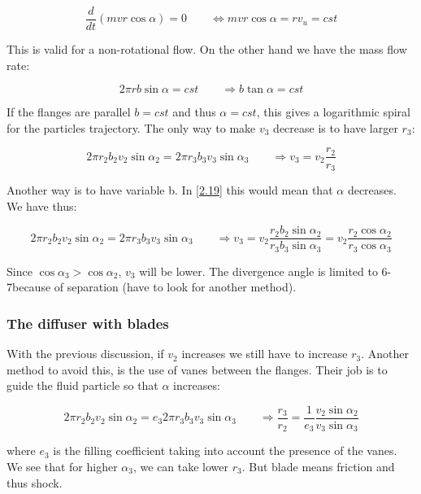 \begin{equation}
\frac{d}{dt} (mvr\cos \alpha) = 0 \qquad \Leftrightarrow mvr\cos \alpha = rv_u = cst
\end{equation}

This is valid for a non-rotational flow. On the other hand we have the mass flow rate: 

\begin{equation}
2 \pi r b \sin \alpha = cst \qquad \Rightarrow b \tan \alpha = cst
\label{2.19}
\end{equation}

If the flanges are parallel $b = cst$ and thus $\alpha = cst$, this gives a logarithmic spiral for the particles trajectory. The only way to make $v_3$ decrease is to have larger $r_3$: 

\begin{equation}
2\pi r_2 b_2 v_2 \sin \alpha _2 = 2\pi r_3 b_3 v_3 \sin \alpha _3 \qquad \Rightarrow v_3 = v_2 \frac{r_2}{r_3}
\end{equation}

Another way is to have variable b. In \eqref{2.19} this would mean that $\alpha$ decreases. We have thus: 

\begin{equation}
2\pi r_2 b_2v_2 \sin \alpha _2 = 2\pi r_3 b_3 v_3\sin \alpha _3 \qquad \Rightarrow v_3 = v_2\frac{r_2 b_2 \sin \alpha _2}{r_3 b_3 \sin \alpha _3} = v_2\frac{r_2 \cos \alpha _2}{r_3 \cos \alpha _3}
\end{equation}

Since $\cos \alpha _3> \cos \alpha _2$, $v_3$ will be lower. The divergence angle is limited to 6-7\degres because of separation (have to look for another method). 

\subsubsection{The diffuser with blades}
With the previous discussion, if $v_2$ increases we still have to increase $r_3$. Another method to avoid this, is the use of vanes between the flanges. Their job is to guide the fluid particle so that $\alpha$ increases: 

\begin{equation}
2\pi r_2 b_2 v_2 \sin \alpha _2 = e_3 2\pi r_3 b_3 v_3 \sin \alpha _3 \qquad \Rightarrow \frac{r_3}{r_2} = \frac{1}{e_3}\frac{v_2 \sin \alpha _2}{v_3 \sin \alpha _3} 
\end{equation}

where $e_3$ is the filling coefficient taking into account the presence of the vanes. We see that for higher $\alpha _3$, we can take lower $r_3$. But blade means friction and thus shock. 

